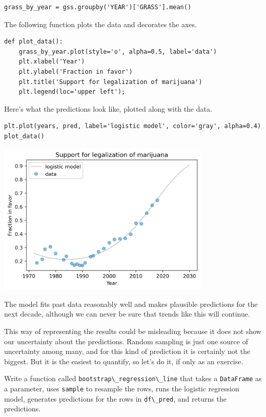 \begin{lstlisting}[]
grass_by_year = gss.groupby('YEAR')['GRASS'].mean()
\end{lstlisting}

The following function plots the data and decorates the axes.

\begin{lstlisting}[]
def plot_data():
    grass_by_year.plot(style='o', alpha=0.5, label='data')
    plt.xlabel('Year')
    plt.ylabel('Fraction in favor')
    plt.title('Support for legalization of marijuana')
    plt.legend(loc='upper left');
\end{lstlisting}

Here's what the predictions look like, plotted along with the data.

\begin{lstlisting}[]
plt.plot(years, pred, label='logistic model', color='gray', alpha=0.4)
plot_data()
\end{lstlisting}

\begin{center}
\includegraphics[width=4in]{chapters/12_bootstrap_files/12_bootstrap_149_0.png}
\end{center}

The model fits past data reasonably well and makes plausible predictions
for the next decade, although we can never be sure that trends like this
will continue.

This way of representing the results could be misleading because it does
not show our uncertainty about the predictions. Random sampling is just
one source of uncertainty among many, and for this kind of prediction it
is certainly not the biggest. But it is the easiest to quantify, so
let's do it, if only as an exercise.

Write a function called
\passthrough{\lstinline!bootstrap\_regression\_line!} that takes a
\passthrough{\lstinline!DataFrame!} as a parameter, uses
\passthrough{\lstinline!sample!} to resample the rows, runs the logistic
regression model, generates predictions for the rows in
\passthrough{\lstinline!df\_pred!}, and returns the predictions.

